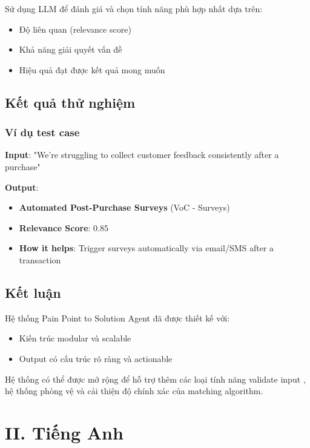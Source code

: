 \documentclass[12pt,a4paper]{article}
\begin{document}
Sử dụng LLM để đánh giá và chọn tính năng phù hợp nhất dựa trên:

\begin{itemize}
    \item Độ liên quan (relevance score)
    \item Khả năng giải quyết vấn đề
    \item Hiệu quả đạt được kết quả mong muốn
\end{itemize}

\subsection{Kết quả thử nghiệm}

\subsubsection{Ví dụ test case}

\textbf{Input}: "We're struggling to collect customer feedback consistently after a purchase"

\textbf{Output}: 
\begin{itemize}
    \item \textbf{Automated Post-Purchase Surveys} (VoC - Surveys)
    \item \textbf{Relevance Score}: 0.85
    \item \textbf{How it helps}: Trigger surveys automatically via email/SMS after a transaction
\end{itemize}

\subsection{Kết luận}

Hệ thống Pain Point to Solution Agent đã được thiết kế với:

\begin{itemize}
    \item Kiến trúc modular và scalable
    \item Output có cấu trúc rõ ràng và actionable
\end{itemize}

Hệ thống có thể được mở rộng để hỗ trợ thêm các loại tính năng validate input , hệ thống phòng vệ và cải thiện độ chính xác của matching algorithm.

\section{II. Tiếng Anh}
\end{document}

